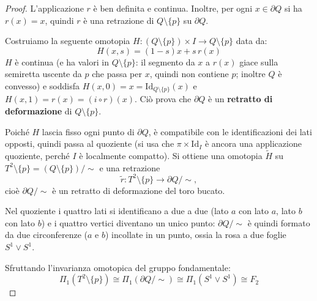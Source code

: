 \begin{proof}
L'applicazione $r$ è ben definita e continua.
Inoltre, per ogni $x \in \partial Q$ si ha $r(x) = x$, quindi $r$ è una retrazione di $Q \setminus \{p\}$ su $\partial Q$.

Costruiamo la seguente omotopia $H: (Q \setminus \{p\}) \times I \to Q \setminus \{p\}$ data da:
\[
H(x, s) = (1-s)x + s\, r(x)
\]
$H$ \`e continua (e ha valori in $Q \setminus \{p\}$: il segmento da $x$ a $r(x)$ giace sulla semiretta uscente da $p$ che passa per $x$, quindi non contiene $p$; inoltre $Q$ \`e convesso) e soddisfa $H(x,0) = x = \mathrm{Id}_{Q \setminus \{p\}}(x)$ e $H(x,1) = r(x) = (i \circ r)(x)$.
Ciò prova che $\partial Q$ è un \textbf{retratto di deformazione} di $Q \setminus \{p\}$.

Poich\'e $H$ lascia fisso ogni punto di $\partial Q$, \`e compatibile con le identificazioni dei lati opposti, quindi passa al quoziente (si usa che $\pi \times \mathrm{Id}_I$ \`e ancora una applicazione quoziente, perch\'e $I$ \`e localmente compatto). Si ottiene una omotopia $\widetilde{H}$ su $T^2 \setminus \{p\} = (Q \setminus \{p\})/\!\sim$ e una retrazione
\[
\widetilde{r}: T^2 \setminus \{p\} \longrightarrow \partial Q / \sim ,
\]
cio\`e $\partial Q/\!\sim$ \`e un retratto di deformazione del toro bucato.

Nel quoziente i quattro lati si identificano a due a due (lato $a$ con lato $a$, lato $b$ con lato $b$) e i quattro vertici diventano un unico punto: $\partial Q / \sim$ \`e quindi formato da due circonferenze ($a$ e $b$) incollate in un punto, ossia la rosa a due foglie $S^1 \vee S^1$.

Sfruttando l'invarianza omotopica del gruppo fondamentale:
\[
\Pi_1(T^2 \setminus \{p\}) \cong \Pi_1(\partial Q / \sim) \cong \Pi_1(S^1 \vee S^1) \cong F_2
\]
\end{proof}

\vspace{2em}


